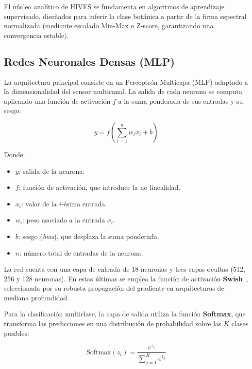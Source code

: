 El núcleo analítico de HIVES se fundamenta en algoritmos de aprendizaje supervisado, diseñados para inferir la clase botánica a partir de la firma espectral normalizada (mediante escalado Min-Max o Z-score, garantizando una convergencia estable).

\subsection{Redes Neuronales Densas (MLP)}

La arquitectura principal consiste en un Perceptrón Multicapa (MLP) adaptado a la dimensionalidad del sensor multicanal. La salida de cada neurona se computa aplicando una función de activación $f$ a la suma ponderada de sus entradas y su sesgo:

\begin{equation}
    y = f\left(\sum_{i=1}^{n} w_i x_i + b\right)
\end{equation}

\noindent Donde:
\begin{itemize}
    \item $y$: salida de la neurona.
    \item $f$: función de activación, que introduce la no linealidad.
    \item $x_i$: valor de la $i$-ésima entrada.
    \item $w_i$: peso asociado a la entrada $x_i$.
    \item $b$: sesgo (\textit{bias}), que desplaza la suma ponderada.
    \item $n$: número total de entradas de la neurona.
\end{itemize}
\newpage
La red cuenta con una capa de entrada de 18 neuronas y tres capas ocultas (512, 256 y 128 neuronas). En estas últimas se emplea la función de activación \textbf{Swish}~\cite{ramachandran2017swish}, seleccionada por su robusta propagación del gradiente en arquitecturas de mediana profundidad.


Para la clasificación multiclase, la capa de salida utiliza la función \textbf{Softmax}, que transforma las predicciones en una distribución de probabilidad sobre las $K$ clases posibles:

\begin{equation}
    \text{Softmax}(z_i) = \frac{e^{z_i}}{\sum_{j=1}^{K} e^{z_j}}
\end{equation}

